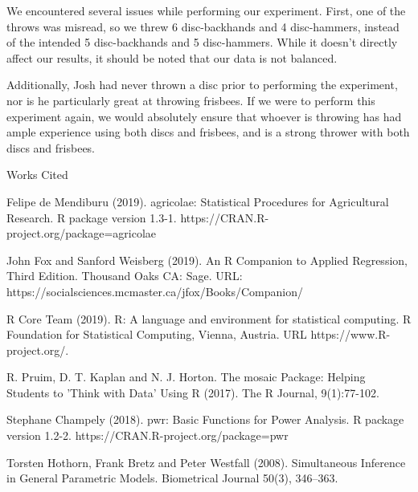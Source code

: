 \documentclass[letter,12pt]{article}
\begin{document}
	We encountered several issues while performing our experiment. First, one of the throws was misread, so we threw 6 disc-backhands and 4 disc-hammers, instead of the intended 5 disc-backhands and 5 disc-hammers. While it doesn’t directly affect our results, it should be noted that our data is not balanced.\par
	Additionally, Josh had never thrown a disc prior to performing the experiment, nor is he particularly great at throwing frisbees. If we were to perform this experiment again, we would absolutely ensure that whoever is throwing has had ample experience using both discs and frisbees, and is a strong thrower with both discs and frisbees.\par
	
	\newpage
	
	\begin{center}
		Works Cited
	\end{center}
	\raggedright
	\begin{hangparas}{.5in}{1}
		Felipe de Mendiburu (2019). agricolae: Statistical Procedures for Agricultural Research. R package version 1.3-1. https://CRAN.R-project.org/package=agricolae
	\end{hangparas}
	\begin{hangparas}{.5in}{1}
		John Fox and Sanford Weisberg (2019). An {R} Companion to Applied Regression, Third Edition. Thousand Oaks CA: Sage. URL: https://socialsciences.mcmaster.ca/jfox/Books/Companion/
	\end{hangparas}
	\begin{hangparas}{.5in}{1}
		R Core Team (2019). R: A language and environment for statistical computing. R Foundation for Statistical Computing, Vienna, Austria. URL https://www.R-project.org/.
	\end{hangparas}
	\begin{hangparas}{.5in}{1}
		R. Pruim, D. T. Kaplan and N. J. Horton. The mosaic Package: Helping Students to 'Think with Data' Using R (2017). The R Journal, 9(1):77-102.
	\end{hangparas}
	\begin{hangparas}{.5in}{1}
		Stephane Champely (2018). pwr: Basic Functions for Power Analysis. R package version 1.2-2. https://CRAN.R-project.org/package=pwr
	\end{hangparas}
	\begin{hangparas}{.5in}{1}
		Torsten Hothorn, Frank Bretz and Peter Westfall (2008). Simultaneous Inference in General Parametric Models. Biometrical Journal 50(3), 346--363.
	\end{hangparas}
\end{document}
